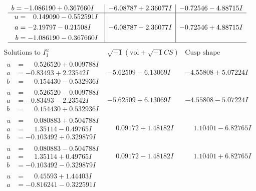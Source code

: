 \documentclass[1p]{elsarticle_modified}
\theoremstyle{definition}
\newcommand{\I}{\sqrt{-1}}
\begin{document}
$$\begin{array}{c|c|c}
\begin{aligned}
b &= -1.086190 + 0.367660 I\end{aligned}
 & -6.08787 + 2.36077 I & -0.72546 - 4.88715 I \\ \hline\begin{aligned}
u &= \phantom{-}0.149090 - 0.552591 I \\
a &= -2.19797 - 0.21508 I \\
b &= -1.086190 - 0.367660 I\end{aligned}
 & -6.08787 - 2.36077 I & -0.72546 + 4.88715 I\\
 \hline 
 \end{array}$$\newpage$$\begin{array}{c|c|c}  
\text{Solutions to }I^u_{1}& \I (\text{vol} + \sqrt{-1}CS) & \text{Cusp shape}\\
 \hline 
\begin{aligned}
u &= \phantom{-}0.526520 + 0.009788 I \\
a &= -0.83493 + 2.23542 I \\
b &= \phantom{-}0.154430 - 0.532936 I\end{aligned}
 & -5.62509 - 6.13069 I & -4.55808 + 5.07224 I \\ \hline\begin{aligned}
u &= \phantom{-}0.526520 - 0.009788 I \\
a &= -0.83493 - 2.23542 I \\
b &= \phantom{-}0.154430 + 0.532936 I\end{aligned}
 & -5.62509 + 6.13069 I & -4.55808 - 5.07224 I \\ \hline\begin{aligned}
u &= \phantom{-}0.080883 + 0.504788 I \\
a &= \phantom{-}1.35114 - 0.49765 I \\
b &= -0.103492 + 0.329879 I\end{aligned}
 & \phantom{-}0.09172 + 1.48182 I & \phantom{-}1.10401 - 6.82765 I \\ \hline\begin{aligned}
u &= \phantom{-}0.080883 - 0.504788 I \\
a &= \phantom{-}1.35114 + 0.49765 I \\
b &= -0.103492 - 0.329879 I\end{aligned}
 & \phantom{-}0.09172 - 1.48182 I & \phantom{-}1.10401 + 6.82765 I \\ \hline\begin{aligned}
u &= \phantom{-}0.45593 + 1.44403 I \\
a &= -0.816241 - 0.322591 I \\

\end{aligned}
\end{array}$$
\end{document}
